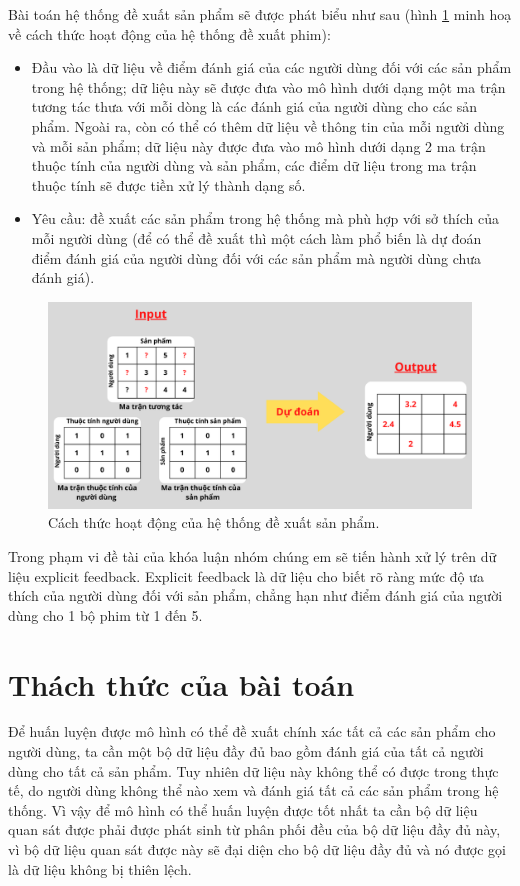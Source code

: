 Bài toán hệ thống đề xuất sản phẩm sẽ được phát biểu như sau (hình \ref{fig:chap1_rs} minh hoạ về cách thức hoạt động của hệ thống đề xuất phim):
\begin{itemize}
    \item Đầu vào là dữ liệu về điểm đánh giá của các người dùng đối với các sản phẩm trong hệ thống; dữ liệu này sẽ được đưa vào mô hình dưới dạng một ma trận tương tác thưa với mỗi dòng là các đánh giá của người dùng cho các sản phẩm. Ngoài ra, còn có thể có thêm dữ liệu về thông tin của mỗi người dùng và mỗi sản phẩm; dữ liệu này được đưa vào mô hình dưới dạng 2 ma trận thuộc tính của người dùng và sản phẩm, các điểm dữ liệu trong ma trận thuộc tính sẽ được tiền xử lý thành dạng số.

    \item Yêu cầu: đề xuất các sản phẩm trong hệ thống mà phù hợp với sở thích của mỗi người dùng (để có thể đề xuất thì một cách làm phổ biến là dự đoán điểm đánh giá của người dùng đối với các sản phẩm mà người dùng chưa đánh giá).
\end{itemize}

\begin{figure}[h]
    \centering
    \includegraphics[width=\textwidth]{images/Chapter1/rs.png}
    \caption{Cách thức hoạt động của hệ thống đề xuất sản phẩm.}
    \label{fig:chap1_rs}
\end{figure}
Trong phạm vi đề tài của khóa luận nhóm chúng em sẽ tiến hành xử lý trên dữ liệu explicit feedback. Explicit feedback là dữ liệu cho biết rõ ràng mức độ ưa thích của người dùng đối với sản phẩm, chẳng hạn như điểm đánh giá của người dùng cho 1 bộ phim từ 1 đến 5. 


\section{Thách thức của bài toán}
\label{section:thachthuc}
Để huấn luyện được mô hình có thể đề xuất chính xác tất cả các sản phẩm cho người dùng, ta cần một bộ dữ liệu đầy đủ bao gồm đánh giá của tất cả người dùng cho tất cả sản phẩm. Tuy nhiên dữ liệu này không thể có được trong thực tế, do người dùng không thể nào xem và đánh giá tất cả các sản phẩm trong hệ thống. Vì vậy để mô hình có thể huấn luyện được tốt nhất ta cần bộ dữ liệu quan sát được phải được phát sinh từ phân phối đều của bộ dữ liệu đầy đủ này, vì bộ dữ liệu quan sát được này sẽ đại diện cho bộ dữ liệu đầy đủ và nó được gọi là dữ liệu không bị thiên lệch. 

